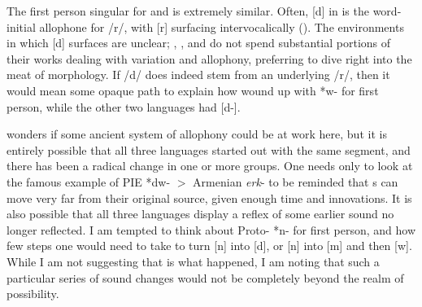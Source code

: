 \documentclass[output=paper]{LSP/langsci}
\begin{document}
The first person singular for  and  is extremely similar. Often, [d] in  is the word-initial allophone for /r/, with [r] surfacing intervocalically (\citealt{Rudes2007}). The environments in which  [d] surfaces are unclear; \citet{Gatschet1885}, \citet{Wagner1934}, and \citet{Linn2000} do not spend substantial portions of their works dealing with variation and allophony, preferring to dive right into the meat of morphology. If  /d/ does indeed stem from an underlying /r/, then it would mean some opaque path to explain how  wound up with *w- for first person, while the other two languages had [d-]. 

\citet{Rankin1998scy} wonders if some ancient system of allophony could be at work here, but it is entirely possible that all three languages started out with the same segment, and there has been a radical change in one or more groups. One needs only to look at the famous example of PIE *dw- $>$ Armenian \emph{erk}- to be reminded that s can move very far from their original source, given enough time and innovations. It is also possible that all three languages display a reflex of some earlier sound no longer reflected. I am tempted to think about Proto- *n- for first person, and how few steps one would need to take to turn [n] into [d], or [n] into [m] and then [w]. While I am not suggesting that is what happened, I am noting that such a particular series of sound changes would not be completely beyond the realm of possibility.
\end{document}
